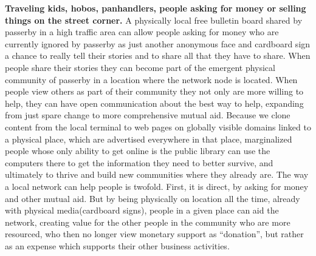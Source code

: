 \documentclass{report}
\begin{document}
\textbf{Traveling kids, hobos, panhandlers, people asking for money or
selling things on the street corner.} A physically local free bulletin
board shared by passerby in a high traffic area can allow people asking
for money who are currently ignored by passerby as just another
anonymous face and cardboard sign a chance to really tell their stories
and to share all that they have to share. When people share their
stories they can become part of the emergent physical community of
passerby in a location where the network node is located. When people
view others as part of their community they not only are more willing to
help, they can have open communication about the best way to help,
expanding from just spare change to more comprehensive mutual aid.
Because we clone content from the local terminal to web pages on
globally visible domains linked to a physical place, which are
advertised everywhere in that place, marginalized people whose only
ability to get online is the public library can use the computers there
to get the information they need to better survive, and ultimately to
thrive and build new communities where they already are. The way a local
network can help people is twofold. First, it is direct, by asking for
money and other mutual aid. But by being physically on location all the
time, already with physical media(cardboard signs), people in a given
place can aid the network, creating value for the other people in the
community who are more resourced, who then no longer view monetary
support as ``donation'', but rather as an expense which supports their
other business activities.
\end{document}
